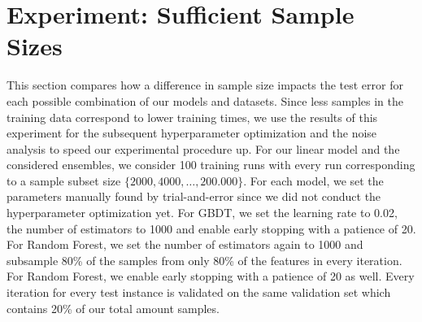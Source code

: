 \section{Experiment: Sufficient Sample Sizes}\label{sec:samplesize}

This section compares how a difference in sample size impacts the test error for each possible combination of our models and datasets. Since less samples in the training data correspond to lower training times, we use the results of this experiment for the subsequent hyperparameter optimization and the noise analysis to speed our experimental procedure up. For our linear model and the considered ensembles, we consider 100 training runs with every run corresponding to a sample subset size $ \{2000, 4000, \dots, 200.000\} $. For each model, we set the parameters manually found by trial-and-error since we did not conduct the hyperparameter optimization yet. For GBDT, we set the learning rate to 0.02, the number of estimators to 1000 and enable early stopping with a patience of 20. For Random Forest, we set the number of estimators again to 1000 and subsample 80\% of the samples from only 80\% of the features in every iteration. For Random Forest, we enable early stopping with a patience of 20 as well. Every iteration for every test instance is validated on the same validation set which contains 20\% of our total amount samples.

